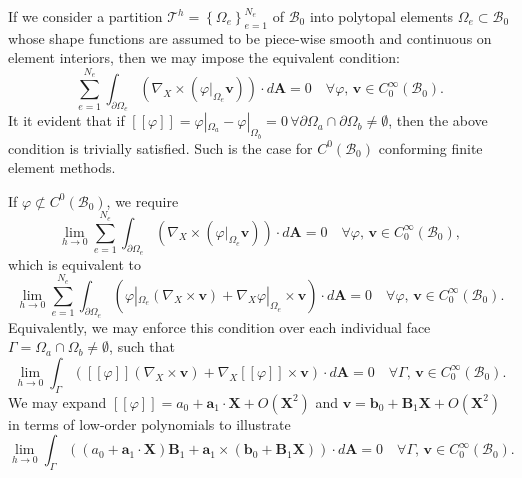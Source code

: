 \documentclass[12pt]{article}
\begin{document}
If we consider a partition $\mathcal{T}^h = \left\{ \Omega_e \right\}_{e=1}^{N_e}$ of $\mathcal{B}_0$ into polytopal elements $\Omega_e \subset \mathcal{B}_0$ whose shape functions are assumed to be piece-wise smooth and continuous on element interiors, then we may impose the equivalent condition:
\begin{equation}
	\sum_{e = 1}^{N_e} \int_{\partial \Omega_e} (\nabla_X \times (\varphi|_{\Omega_e} \mathbf{v})) \cdot d\mathbf{A} = 0 \quad \forall \varphi, \, \mathbf{v} \in C^\infty_0 (\mathcal{B}_0).
\end{equation}
It it evident that if $[\![ \varphi ]\!] = \varphi|_{\Omega_a} - \varphi|_{\Omega_b} = 0 \, \forall \partial \Omega_a \cap \partial \Omega_b \neq \emptyset$, then the above condition is trivially satisfied. Such is the case for $C^0 (\mathcal{B}_0)$ conforming finite element methods.

If $\varphi \not\subset C^0 (\mathcal{B}_0)$, we require
\begin{equation}
	\lim_{h \rightarrow 0} \sum_{e = 1}^{N_e} \int_{\partial \Omega_e} (\nabla_X \times (\varphi|_{\Omega_e} \mathbf{v})) \cdot d\mathbf{A} = 0 \quad \forall \varphi, \, \mathbf{v} \in C^\infty_0 (\mathcal{B}_0),
\end{equation}
which is equivalent to
\begin{equation}
	\lim_{h \rightarrow 0} \sum_{e = 1}^{N_e} \int_{\partial \Omega_e} (\varphi|_{\Omega_e} (\nabla_X \times \mathbf{v}) + \nabla_X \varphi|_{\Omega_e} \times \mathbf{v}) \cdot d\mathbf{A} = 0 \quad \forall \varphi, \, \mathbf{v} \in C^\infty_0 (\mathcal{B}_0).
\end{equation}
Equivalently, we may enforce this condition over each individual face $\Gamma = \Omega_a \cap \Omega_b \neq \emptyset$, such that
\begin{equation}
	\lim_{h \rightarrow 0} \int_{\Gamma} ([\![ \varphi ]\!] (\nabla_X \times \mathbf{v}) + \nabla_X [\![ \varphi ]\!] \times \mathbf{v}) \cdot d\mathbf{A} = 0 \quad \forall \Gamma, \, \mathbf{v} \in C^\infty_0 (\mathcal{B}_0).
\end{equation}
We may expand $[\![ \varphi ]\!] = a_0 + \mathbf{a}_1 \cdot \mathbf{X} + O(\mathbf{X}^2)$ and $\mathbf{v} = \mathbf{b}_0 + \mathbf{B}_1 \mathbf{X} + O(\mathbf{X}^2)$ in terms of low-order polynomials to illustrate
\begin{equation}
	\lim_{h \rightarrow 0} \int_{\Gamma} ((a_0 + \mathbf{a}_1 \cdot \mathbf{X}) \mathbf{B}_1 + \mathbf{a}_1 \times (\mathbf{b}_0 + \mathbf{B}_1 \mathbf{X})) \cdot d\mathbf{A} = 0 \quad \forall \Gamma, \, \mathbf{v} \in C^\infty_0 (\mathcal{B}_0).
\end{equation}
\end{document}
